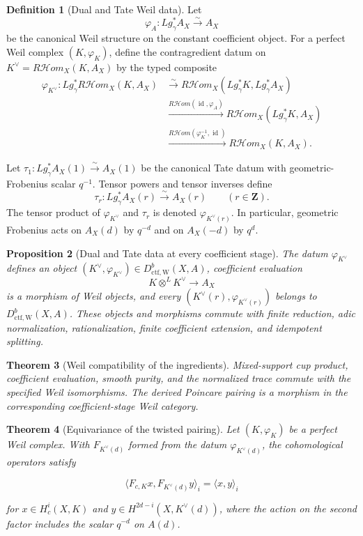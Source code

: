 \documentclass[10pt]{article}
\newtheorem{theorem}{Theorem}[section]
\newtheorem{proposition}[theorem]{Proposition}
\theoremstyle{definition}
\newtheorem{definition}[theorem]{Definition}
\newcommand{\RHom}{R\mathcal Hom}
\newcommand{\DctfW}{D^b_{\mathrm{ctf,W}}}
\begin{document}
\begin{definition}[Dual and Tate Weil data]
Let
\[
 \varphi_A:Lg_\gamma^*A_X\xrightarrow{\sim}A_X
\]
be the canonical Weil structure on the constant coefficient object.  For a
perfect Weil complex \((K,\varphi_K)\), define the contragredient datum on
\(K^\vee=\RHom_X(K,A_X)\) by the typed composite
\[
\begin{split}
 \varphi_{K^\vee}:Lg_\gamma^*\RHom_X(K,A_X)
 &\xrightarrow{\sim}
 \RHom_X(Lg_\gamma^*K,Lg_\gamma^*A_X)\\
 &\xrightarrow{\RHom(\operatorname{id},\varphi_A)}
 \RHom_X(Lg_\gamma^*K,A_X)\\
 &\xrightarrow{\RHom(\varphi_K^{-1},\operatorname{id})}
 \RHom_X(K,A_X).
\end{split}
\]

Let \(\tau_1:L g_\gamma^*A_X(1)\xrightarrow{\sim}A_X(1)\) be the canonical
Tate datum with geometric-Frobenius scalar \(q^{-1}\).  Tensor powers and
tensor inverses define
\[
 \tau_r:L g_\gamma^*A_X(r)\xrightarrow{\sim}A_X(r)
 \qquad(r\in\mathbf Z).
\]
The tensor product of \(\varphi_{K^\vee}\) and \(\tau_r\) is denoted
\(\varphi_{K^\vee(r)}\).  In particular, geometric Frobenius acts on
\(A_X(d)\) by \(q^{-d}\) and on \(A_X(-d)\) by \(q^d\).
\end{definition}

\begin{proposition}[Dual and Tate data at every coefficient stage]
The datum \(\varphi_{K^\vee}\) defines an object
\((K^\vee,\varphi_{K^\vee})\in\DctfW(X,A)\), coefficient evaluation
\[
 K\otimes^LK^\vee\longrightarrow A_X
\]
is a morphism of Weil objects, and every
\((K^\vee(r),\varphi_{K^\vee(r)})\) belongs to \(\DctfW(X,A)\).  These
objects and morphisms commute with finite reduction, adic normalization,
rationalization, finite coefficient extension, and idempotent splitting.
\end{proposition}

\begin{theorem}[Weil compatibility of the ingredients]
Mixed-support cup product, coefficient evaluation, smooth purity, and the
normalized trace commute with the specified Weil isomorphisms.  The derived
Poincare pairing is a morphism in the corresponding coefficient-stage Weil
category.
\end{theorem}

\begin{theorem}[Equivariance of the twisted pairing]
Let \((K,\varphi_K)\) be a perfect Weil complex.  With
\(F_{K^\vee(d)}\) formed from the datum \(\varphi_{K^\vee(d)}\), the
cohomological operators satisfy

\[
 \bigl\langle F_{c,K}x,F_{K^\vee(d)}y\bigr\rangle_i
 =\langle x,y\rangle_i
\]

for
\(x\in H_c^i(X,K)\) and
\(y\in H^{2d-i}(X,K^\vee(d))\), where the action on the second factor
includes the scalar \(q^{-d}\) on \(A(d)\).
\end{theorem}
\end{document}
